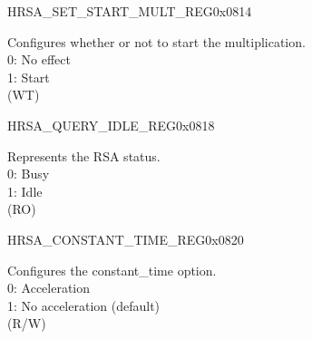 \begin{register}{H}{RSA\_SET\_START\_MULT\_REG}{0x0814}\label{regdesc:RSASETSTARTMULTREG}
%
%
\regnewline%
\begin{regdesc}\begin{reglist}
\label{fielddesc:RSASETSTARTMULT}\item [RSA\_SET\_START\_MULT] Configures whether or not to start the multiplication.\\
0: No effect\\
1: Start\\
 (WT)
\end{reglist}\end{regdesc}
\end{register}


\begin{register}{H}{RSA\_QUERY\_IDLE\_REG}{0x0818}\label{regdesc:RSAQUERYIDLEREG}
%
%
\regnewline%
\begin{regdesc}\begin{reglist}
\label{fielddesc:RSAQUERYIDLE}\item [RSA\_QUERY\_IDLE] Represents the RSA status.\\
0: Busy\\
1: Idle\\
 (RO)
\end{reglist}\end{regdesc}
\end{register}


\begin{register}{H}{RSA\_CONSTANT\_TIME\_REG}{0x0820}\label{regdesc:RSACONSTANTTIMEREG}
%
%
\regnewline%
\begin{regdesc}\begin{reglist}
\label{fielddesc:RSACONSTANTTIME}\item [RSA\_CONSTANT\_TIME] Configures the constant\_time option. \\
0: Acceleration\\
1: No acceleration (default)\\
 (R/W)
\end{reglist}\end{regdesc}
\end{register}

